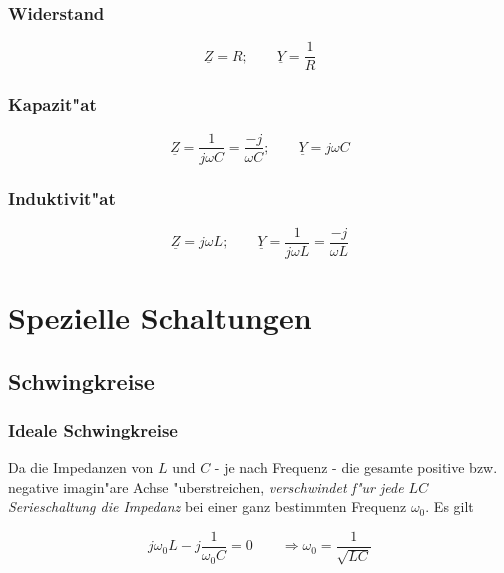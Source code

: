 \documentclass[german, 10pt, a4paper, headsepline]{scrreprt}
\theoremstyle{remark}
\begin{document}
\subsubsection{Widerstand}

\begin{displaymath}
	\underline{Z} = R; \qquad \underline{Y}=\frac{1}{R}
\end{displaymath}

\subsubsection{Kapazit"at}

\begin{displaymath}
	\underline{Z} = \frac{1}{j\omega C}=\frac{-j}{\omega C}; \qquad \underline{Y}=j\omega C
\end{displaymath}

\subsubsection{Induktivit"at}

\begin{displaymath}
	\underline{Z} = j\omega L; \qquad \underline{Y}=\frac{1}{j\omega L}=\frac{-j}{\omega L}
\end{displaymath}

\section{Spezielle Schaltungen}

\subsection{Schwingkreise}

\subsubsection{Ideale Schwingkreise}

Da die Impedanzen von $L$ und $C$ - je nach Frequenz - die gesamte positive bzw. negative imagin"are Achse "uberstreichen, \textit{verschwindet f"ur jede $LC$ Serieschaltung die Impedanz} bei einer ganz bestimmten Frequenz $\omega_0$. Es gilt

\begin{displaymath}
	j\omega_0 L - j\frac{1}{\omega_0 C} = 0 \qquad \Rightarrow \omega_0 = \frac{1}{\sqrt{LC}}
\end{displaymath}
\end{document}
